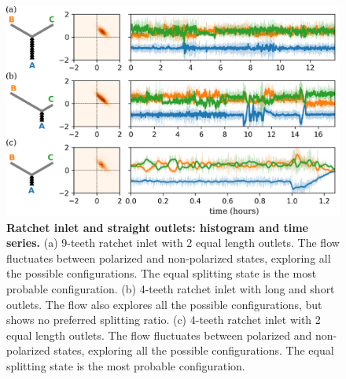 \documentclass[%
10pt,
superscriptaddress,
twocolumn,
 amsmath,amssymb,
 aps,prx,
]{revtex4-2}
\begin{document}
\begin{figure}[!h]
    \includegraphics[width=\textwidth]{4-straight-channel-length}
    \caption{
    \textbf{Ratchet inlet and straight outlets: histogram and time series.}
    (a) 9-teeth ratchet inlet with 2 equal length outlets. 
    The flow fluctuates between polarized and non-polarized states, exploring all the possible configurations.
    The equal splitting state is the most probable configuration.
    (b) 4-teeth ratchet inlet with long and short outlets.
    The flow also explores all the possible configurations, but shows no preferred splitting ratio.
    (c) 4-teeth ratchet inlet with 2 equal length outlets.
    The flow fluctuates between polarized and non-polarized states, exploring all the possible configurations.
    The equal splitting state is the most probable configuration.
    }
    \label{fig:straight-channel-length}
\end{figure}
\end{document}
